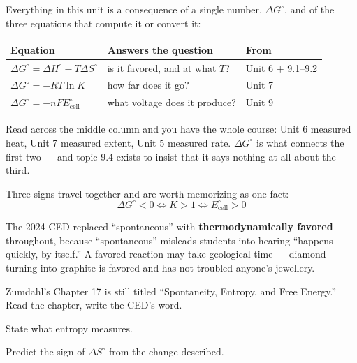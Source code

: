 \documentclass{apchem-notes}
\begin{document}
\apctitleblock

\begin{apcnote}
Everything in this unit is a consequence of a single number, $\Delta G^\circ$,
and of the three equations that compute it or convert it:

\begin{center}
\renewcommand{\arraystretch}{1.25}
\begin{tabular}{@{}lll@{}}
\hline
\textbf{Equation} & \textbf{Answers the question} & \textbf{From} \\
\hline
$\Delta G^\circ = \Delta H^\circ - T\Delta S^\circ$ &
  is it favored, and at what $T$? & Unit 6 $+$ 9.1--9.2 \\
$\Delta G^\circ = -RT\ln K$ &
  how far does it go? & Unit 7 \\
$\Delta G^\circ = -nFE^\circ_{\text{cell}}$ &
  what voltage does it produce? & Unit 9 \\
\hline
\end{tabular}
\end{center}

Read across the middle column and you have the whole course: Unit 6 measured
heat, Unit 7 measured extent, Unit 5 measured rate. $\Delta G^\circ$ is what
connects the first two --- and topic 9.4 exists to insist that it says
nothing at all about the third.

\medskip
Three signs travel together and are worth memorizing as one fact:
\[ \Delta G^\circ < 0 \iff K > 1 \iff E^\circ_{\text{cell}} > 0 \]
\end{apcnote}

\begin{apctrap}
The 2024 CED replaced ``spontaneous'' with
\textbf{thermodynamically favored} throughout, because ``spontaneous''
misleads students into hearing ``happens quickly, by itself.'' A favored
reaction may take geological time --- diamond turning into graphite is
favored and has not troubled anyone's jewellery.

Zumdahl's Chapter 17 is still titled ``Spontaneity, Entropy, and Free
Energy.'' Read the chapter, write the CED's word.
\end{apctrap}


\begin{objectives}
  \item State what entropy measures.
  \item Predict the sign of $\Delta S^\circ$ from the change described.
\end{objectives}
\end{document}
